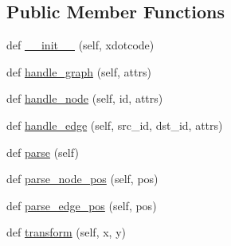 \subsection*{Public Member Functions}
\begin{DoxyCompactItemize}
\item 
def \hyperlink{classsmacc__viewer_1_1xdot_1_1xdot_1_1XDotParser_a1f7c20111b1ee9cd28bc4556f2cd06bb}{\+\_\+\+\_\+init\+\_\+\+\_\+} (self, xdotcode)
\item 
def \hyperlink{classsmacc__viewer_1_1xdot_1_1xdot_1_1XDotParser_a733c3b35b32dca660005970397474a15}{handle\+\_\+graph} (self, attrs)
\item 
def \hyperlink{classsmacc__viewer_1_1xdot_1_1xdot_1_1XDotParser_a2447765fab39800834af0c26834398cd}{handle\+\_\+node} (self, id, attrs)
\item 
def \hyperlink{classsmacc__viewer_1_1xdot_1_1xdot_1_1XDotParser_a52bddf39ebaebf552a806c879d6b0cfa}{handle\+\_\+edge} (self, src\+\_\+id, dst\+\_\+id, attrs)
\item 
def \hyperlink{classsmacc__viewer_1_1xdot_1_1xdot_1_1XDotParser_aa4143ed0fc5df44a34a48d664397bb21}{parse} (self)
\item 
def \hyperlink{classsmacc__viewer_1_1xdot_1_1xdot_1_1XDotParser_aa8c1803b0418e65b40bda63bf127248b}{parse\+\_\+node\+\_\+pos} (self, pos)
\item 
def \hyperlink{classsmacc__viewer_1_1xdot_1_1xdot_1_1XDotParser_a197eeb6847d6621e4174b4f438a961c8}{parse\+\_\+edge\+\_\+pos} (self, pos)
\item 
def \hyperlink{classsmacc__viewer_1_1xdot_1_1xdot_1_1XDotParser_a490b6dcfb3944af0d6d691f1aa25db54}{transform} (self, x, y)
\end{DoxyCompactItemize}
